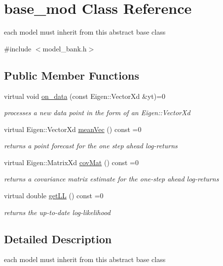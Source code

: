 \hypertarget{classbase__mod}{}\section{base\+\_\+mod Class Reference}
\label{classbase__mod}


each model must inherit from this abstract base class  




{\ttfamily \#include $<$model\+\_\+bank.\+h$>$}

\subsection*{Public Member Functions}
\begin{DoxyCompactItemize}
\item 
virtual void \hyperlink{classbase__mod_a347fb7e0a320a2c29cadfdd9d084c311}{on\+\_\+data} (const Eigen\+::\+Vector\+Xd \&yt)=0
\begin{DoxyCompactList}\small\item\em processes a new data point in the form of an Eigen\+::\+Vector\+Xd \end{DoxyCompactList}\item 
virtual Eigen\+::\+Vector\+Xd \hyperlink{classbase__mod_a4191d277945f98b4a6eaa663cb70d678}{mean\+Vec} () const =0
\begin{DoxyCompactList}\small\item\em returns a point forecast for the one step ahead log-\/returns \end{DoxyCompactList}\item 
virtual Eigen\+::\+Matrix\+Xd \hyperlink{classbase__mod_a7cad99311e5ea17679f3eae2b5fd4319}{cov\+Mat} () const =0
\begin{DoxyCompactList}\small\item\em returns a covariance matrix estimate for the one-\/step ahead log-\/returns \end{DoxyCompactList}\item 
virtual double \hyperlink{classbase__mod_a7d580c83175fab5d1f553afabca9da50}{get\+LL} () const =0
\begin{DoxyCompactList}\small\item\em returns the up-\/to-\/date log-\/likelihood \end{DoxyCompactList}\end{DoxyCompactItemize}


\subsection{Detailed Description}
each model must inherit from this abstract base class 

